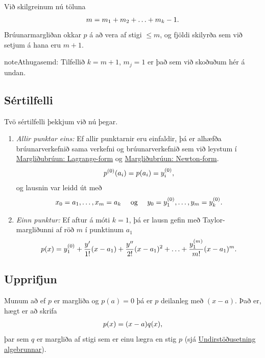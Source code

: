 \documentclass[A4paper,10pt,icelandic]{sphinxmanual}
\begin{document}
Við skilgreinum nú töluna
\begin{gather}
\begin{split}m = m_1 + m_2 + \ldots + m_k - 1.\end{split}\notag
\end{gather}
Brúunarmargliðan okkar \(p\) á að vera af stigi \(\leq m\), og
fjöldi skilyrða sem við setjum á hana eru \(m+1\).

\begin{notice}{note}{Athugasemd:}
Tilfellið \(k=m+1\), \(m_j=1\) er það sem við skoðuðum hér á undan.
\end{notice}


\subsection{Sértilfelli}
\label{kafli03:sertilfelli}
Tvö sértilfelli þekkjum við nú þegar.
\begin{enumerate}
\item {} 
\emph{Allir punktar eins:} Ef allir punktarnir eru einfaldir, þá er
alhæfða brúunarverkefnið sama verkefni og brúunarverkefnið sem við
leystum í {\hyperref[kafli03:margliubruun-lagrange-form]{Margliðubrúun: Lagrange-form}} og {\hyperref[kafli03:margliubruun-newton-form]{Margliðubrúun: Newton-form}}.
\begin{gather}
\begin{split}p^{(0)}(a_i) = p(a_i) = y_i^{(0)},\end{split}\notag
\end{gather}
og lausnin var leidd út með
\begin{gather}
\begin{split}x_0=a_1,\dots,x_m=a_k \quad \text{ og } \quad
y_0=y_1^{(0)},\dots,y_m=y_k^{(0)}.\end{split}\notag
\end{gather}
\item {} 
\emph{Einn punktur:} Ef aftur á móti \(k = 1\), þá er lausn gefin
með Taylor-margliðunni af röð \(m\) í punktinum \(a_1\)
\begin{gather}
\begin{split}p(x) = y_1^{(0)} + \frac{y'}{1!}(x - a_1) + \frac{y''}{2!}(x - a_1)^2 +
  \ldots + \frac{y_1^{(m)}}{m!}(x - a_1)^m.\end{split}\notag
\end{gather}
\end{enumerate}


\subsection{Upprifjun}
\label{kafli03:upprifjun}
Munum að ef \(p\) er margliða og \(p(a)=0\) þá er \(p\)
deilanleg með \((x-a)\). Það er, hægt er að skrifa
\begin{gather}
\begin{split}p(x) = (x-a)q(x),\end{split}\notag
\end{gather}
þar sem \(q\) er margliða af stigi sem er einu lægra en stig
\(p\) (sjá \href{http://m.xn--st-2ia.is/fletta/undirst\%C3\%B6\%C3\%B0usetning/algebrunnar?device=desktop}{Undirstöðusetning algebrunnar}).
\end{document}

